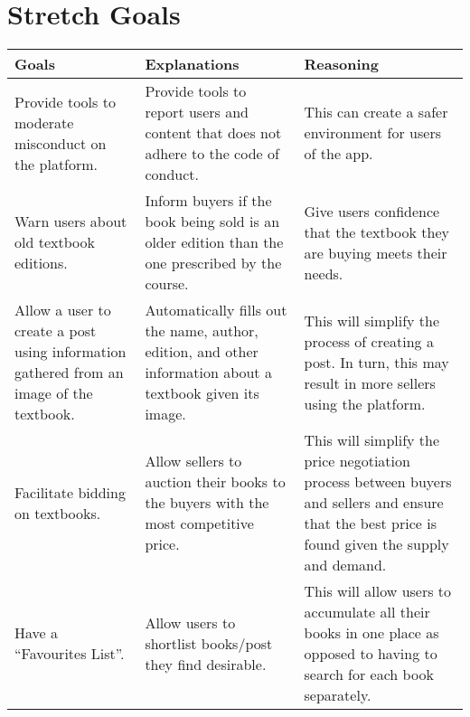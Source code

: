 \documentclass[fullpage]{article}
\newcommand{\bc}{\begin{center}}
\newcommand{\ec}{\end{center}}
\begin{document}
\section{Stretch Goals}
\bc

\begin{tabular}{| p{4cm}| p{4cm}| p{4cm}|}

\hline
 \rowcolor{lightgray} 
\textbf{Goals} & \textbf{Explanations} &\textbf{Reasoning}\\
\hline
Provide tools to moderate misconduct on the platform. & Provide tools to report users and content that does not adhere to the code of conduct. & This can create a safer environment for users of the app.\\
\hline
Warn users about old textbook editions. &Inform buyers if the book being sold is an older edition than the one prescribed by the course. & Give users confidence that the textbook they are buying meets their needs.\\
\hline
Allow a user to create a post using information gathered from an image of the textbook. & Automatically fills out the name, author, edition, and other information about a textbook given its image. & This will simplify the process of creating a post. In turn, this may result in more sellers using the platform.\\
\hline
Facilitate bidding on textbooks. & Allow sellers to auction their books to the buyers with the most competitive price. &This will simplify the price negotiation process between buyers and sellers and ensure that the best price is found given the supply and demand.\\
\hline
Have a ``Favourites List''. & Allow users to shortlist books/post they find desirable. & This will allow users to accumulate all their books in one place as opposed to having to search for each book separately.\\
\hline
\end{tabular}
\ec
\end{document}
